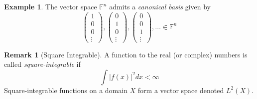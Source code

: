 \documentclass[11pt, reqno]{amsart}
\theoremstyle{definition} %
\newtheorem{remark}[theorem]{Remark}
\newtheorem{example}[theorem]{Example}
\newcommand{\F}{\mathbb{F}}
\begin{document}
\begin{example}
    The vector space $\F^n$ admits a \emph{canonical basis} given by
    \begin{equation}
        \begin{pmatrix}
            1\\
            0\\
            0\\
            \vdots
        \end{pmatrix}
        ,
        \begin{pmatrix}
            0\\
            1\\
            0\\
            \vdots
        \end{pmatrix}
        ,
        \begin{pmatrix}
            0\\
            0\\
            1\\
            \vdots
        \end{pmatrix}
        ,\dots\in \F^n
    \end{equation}
\end{example}

\begin{remark}[Square Integrable]
A function to the real (or complex) numbers is called \emph{square-integrable} if 
    \begin{equation}
    \int |f(x)|^2dx < \infty
    \end{equation}
    Square-integrable functions on a domain $X$ form a vector space denoted $L^2(X)$.
\end{remark}
\end{document}
